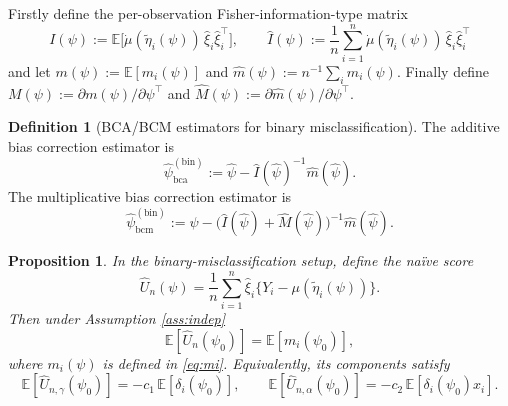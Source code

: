 \documentclass[11pt]{article}
\newtheorem{proposition}{Proposition}
\theoremstyle{definition}
\newtheorem{definition}{Definition}
\theoremstyle{remark}
\newcommand{\E}{\mathbb{E}}
\begin{document}
Firstly define the per-observation Fisher-information-type matrix
\begin{equation}
I(\psi):=\E\big[\dot\mu(\tilde\eta_i(\psi))\,\hat\xi_i\hat\xi_i^\top\big],\qquad \hat I(\psi):=\frac{1}{n}\sum_{i=1}^n \dot\mu(\tilde\eta_i(\psi))\,\hat\xi_i\hat\xi_i^\top
\label{eq:I}
\end{equation}
and let $m(\psi):=\E[m_i(\psi)]$ and $\hat m(\psi):=n^{-1}\sum_i m_i(\psi)$. Finally define
$M(\psi):=\partial m(\psi)/\partial\psi^\top$ and $\hat M(\psi):=\partial\hat m(\psi)/\partial\psi^\top$.

\begin{definition}[BCA/BCM estimators for binary misclassification]
The additive bias correction estimator is
\begin{equation}
\hat\psi_{\mathrm{bca}}^{\mathrm{(bin)}}:=\hat\psi-\hat I(\hat\psi)^{-1}\hat m(\hat\psi).
\label{eq:bca-bin}
\end{equation}
The multiplicative bias correction estimator is
\begin{equation}
\hat\psi_{\mathrm{bcm}}^{\mathrm{(bin)}}:=\hat\psi-\big(\hat I(\hat\psi)+\hat M(\hat\psi)\big)^{-1}\hat m(\hat\psi).
\label{eq:bcm-bin}
\end{equation}
\end{definition}

\begin{proposition}\label{prop:score-drift}
In the binary-misclassification setup, define the na\"ive score
\[\hat U_n(\psi)=\frac{1}{n}\sum_{i=1}^n \hat\xi_i\{Y_i-\mu(\tilde\eta_i(\psi))\}.\]
Then under Assumption \ref{ass:indep}
\[\E[\hat U_n(\psi_0)]=\E[m_i(\psi_0)],\]
where $m_i(\psi)$ is defined in \eqref{eq:mi}. Equivalently, its components satisfy
\[\E[\hat U_{n,\gamma}(\psi_0)]=-c_1\,\E[\delta_i(\psi_0)],\qquad \E[\hat U_{n,\alpha}(\psi_0)]=-c_2\,\E[\delta_i(\psi_0)x_i].\]
\end{proposition}
\end{document}
